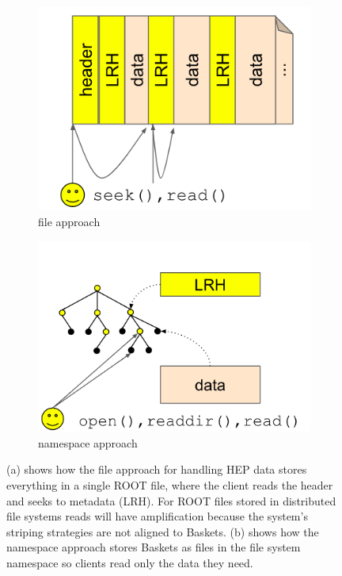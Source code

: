 \begin{figure}[t!]
    \centering
    \begin{subfigure}[b]{.45\linewidth}
      \centering
      \includegraphics[width=1.0\linewidth]{figures/tree_hep_a.png} 
      \caption{file approach}
      \label{fig:tree_hep_a}
    \end{subfigure}
    \begin{subfigure}[b]{.45\linewidth}
      \centering
      \includegraphics[width=1.0\linewidth]{figures/tree_hep_b.png} 
      \caption{namespace approach}
      \label{fig:tree_hep_b}
    \end{subfigure}
    \caption{(a) shows how the file approach for handling HEP data stores
everything in a single ROOT file, where the client reads the header and seeks
to metadata (LRH). For ROOT files stored in distributed file systems reads will
have amplification because the system's striping strategies are not aligned to
Baskets. (b) shows how the namespace approach stores Baskets as files in the
file system namespace so clients read only the data they need.}
\end{figure}

